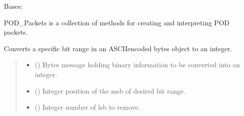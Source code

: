 \documentclass[letterpaper,10pt,english]{sphinxmanual}
\begin{document}
\begin{fulllineitems}
\label{\detokenize{PodPacketHandling:PodPacketHandling.POD_Packets}}
\pysigstartsignatures
{}
\pysigstopsignatures
\sphinxAtStartPar
Bases: 

\sphinxAtStartPar
POD\_Packets is a collection of methods for creating and interpreting POD packets.

\begin{fulllineitems}
\label{\detokenize{PodPacketHandling:PodPacketHandling.POD_Packets.ASCIIbytesToInt_Split}}
\pysigstartsignatures
{}
\pysigstopsignatures
\sphinxAtStartPar
Converts a specific bit range in an ASCII\sphinxhyphen{}encoded bytes object to an integer.
\begin{quote}\begin{description}
\begin{itemize}
\item {} 
\sphinxAtStartPar
{} () \textendash{} Bytes message holding binary information to be converted into an integer.

\item {} 
\sphinxAtStartPar
{} () \textendash{} Integer position of the msb of desired bit range.

\item {} 
\sphinxAtStartPar
{} () \textendash{} Integer number of lsb to remove.

\end{itemize}


\end{description}
\end{quote}
\end{fulllineitems}
\end{fulllineitems}
\end{document}
